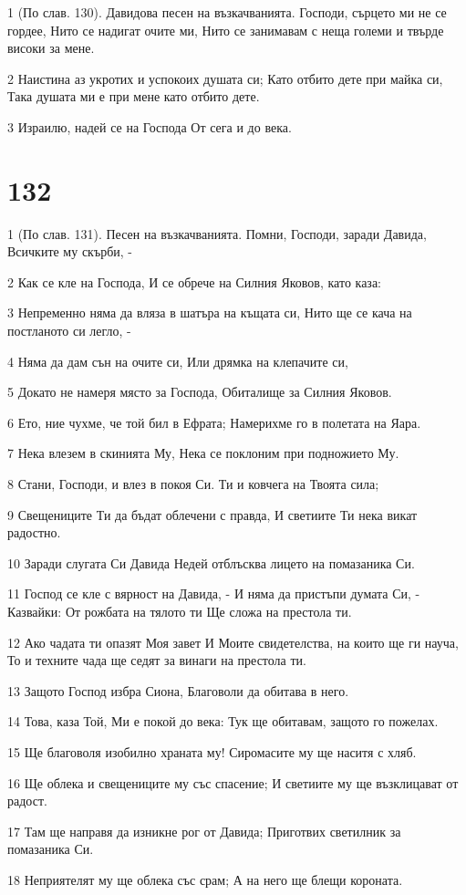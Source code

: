 \par 1 (По слав. 130). Давидова песен на възкачванията. Господи, сърцето ми не се гордее, Нито се надигат очите ми, Нито се занимавам с неща големи и твърде високи за мене.
\par 2 Наистина аз укротих и успокоих душата си; Като отбито дете при майка си, Така душата ми е при мене като отбито дете.
\par 3 Израилю, надей се на Господа От сега и до века.

\chapter{132}

\par 1 (По слав. 131). Песен на възкачванията. Помни, Господи, заради Давида, Всичките му скърби, -
\par 2 Как се кле на Господа, И се обрече на Силния Яковов, като каза:
\par 3 Непременно няма да вляза в шатъра на къщата си, Нито ще се кача на постланото си легло, -
\par 4 Няма да дам сън на очите си, Или дрямка на клепачите си,
\par 5 Докато не намеря място за Господа, Обиталище за Силния Яковов.
\par 6 Ето, ние чухме, че той бил в Ефрата; Намерихме го в полетата на Яара.
\par 7 Нека влезем в скинията Му, Нека се поклоним при подножието Му.
\par 8 Стани, Господи, и влез в покоя Си. Ти и ковчега на Твоята сила;
\par 9 Свещениците Ти да бъдат облечени с правда, И светиите Ти нека викат радостно.
\par 10 Заради слугата Си Давида Недей отблъсква лицето на помазаника Си.
\par 11 Господ се кле с вярност на Давида, - И няма да пристъпи думата Си, - Казвайки: От рожбата на тялото ти Ще сложа на престола ти.
\par 12 Ако чадата ти опазят Моя завет И Моите свидетелства, на които ще ги науча, То и техните чада ще седят за винаги на престола ти.
\par 13 Защото Господ избра Сиона, Благоволи да обитава в него.
\par 14 Това, каза Той, Ми е покой до века: Тук ще обитавам, защото го пожелах.
\par 15 Ще благоволя изобилно храната му! Сиромасите му ще наситя с хляб.
\par 16 Ще облека и свещениците му със спасение; И светиите му ще възклицават от радост.
\par 17 Там ще направя да изникне рог от Давида; Приготвих светилник за помазаника Си.
\par 18 Неприятелят му ще облека със срам; А на него ще блещи короната.

